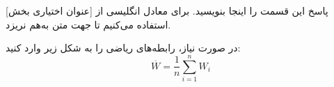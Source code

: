 
[عنوان اختیاری بخش]
پاسخ این قسمت را اینجا بنویسید. برای معادل انگلیسی از
 استفاده می‌کنیم تا جهت متن به‌هم نریزد.

در صورت نیاز، رابطه‌های ریاضی را به شکل زیر وارد کنید:
\[
  \overline{W}=\frac{1}{n}\sum_{i=1}^{n}W_i
\]


